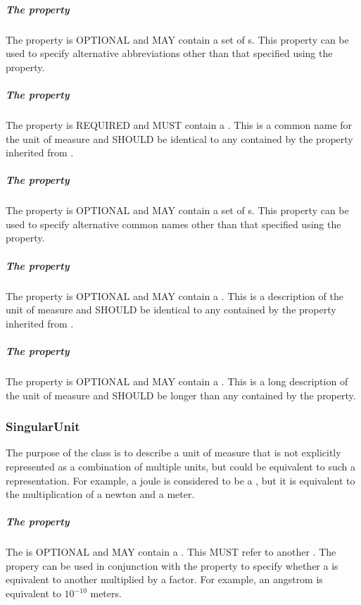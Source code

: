 \subparagraph{The  property}\label{sec:alternativeSymbols:Unit}
The  property is OPTIONAL and MAY contain a set of s. This property can be used to specify alternative abbreviations other than that specified using the  property.

\subparagraph{The  property}\label{sec:label:Unit}
The  property is REQUIRED and MUST contain a . This  is a common name for the unit of measure and SHOULD be identical to any  contained by the  property inherited from .

\subparagraph{The  property}\label{sec:alternativeLabels:Unit}
The  property is OPTIONAL and MAY contain a set of s. This property can be used to specify alternative common names other than that specified using the  property.

\subparagraph{The  property}\label{sec:comment:Unit}
The  property is OPTIONAL and MAY contain a . This  is a description of the unit of measure and SHOULD be identical to any  contained by the  property inherited from .

\subparagraph{The  property}\label{sec:longcomment:Unit}
The  property is OPTIONAL and MAY contain a . This  is a long description of the unit of measure and SHOULD be longer than any  contained by the  property.

\subsubsection{SingularUnit}
\label{sec:SingularUnit}

The purpose of the  class is to describe a unit of measure that is not explicitly represented as a combination of multiple units, but could be equivalent to such a representation. For example, a joule is considered to be a , but it is equivalent to the multiplication of a newton and a meter.  

\subparagraph{The  property}\label{sec:hasUnit:SingularUnit}
The  is OPTIONAL and MAY contain a . This  MUST refer to another . The  propery can be used in conjunction with the  property to specify whether a  is equivalent to another  multiplied by a factor. For example, an angstrom is equivalent to $10^{-10}$ meters.

